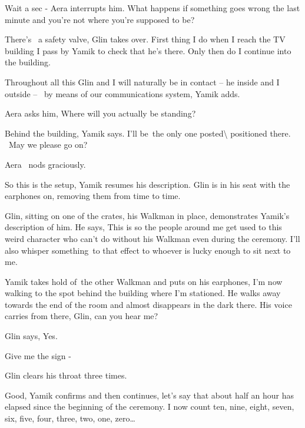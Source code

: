 \documentclass[letterpaper]{article}
\begin{document}
{\textquotedbl}Wait a sec - {\textquotedbl} Aera interrupts him. {\textquotedbl}What happens if something goes wrong the
last minute and you're not where you're supposed to be?{\textquotedbl} 

{\textquotedbl}There's ~a safety valve,{\textquotedbl} Glin takes over. {\textquotedbl}First thing I do when I reach the
TV building I pass by Yamik to check that he's there. Only then do I continue into the building.{\textquotedbl} 

{\textquotedbl}Throughout all this Glin and I will naturally be in contact -- he inside and I outside -- \ by means of
our communications system,{\textquotedbl} Yamik adds.

Aera asks him, {\textquotedbl}Where will you actually be standing?{\textquotedbl} 

{\textquotedbl}Behind the building,{\textquotedbl} Yamik says. {\textquotedbl}I'll be~the only one
posted{\textbackslash} positioned there.{ \ }May we please go
on?{\textbar}{\textquotedbl}

Aera \ nods graciously.

{\textquotedbl}So this is the setup,{\textquotedbl} Yamik resumes his description. {\textquotedbl}Glin is in his seat
with the earphones on, removing them from time to time.{\textquotedbl} 

Glin, sitting on one of the crates, his Walkman in place, demonstrates Yamik's description of him. He says,
{\textquotedbl}This is so the{ }people around me get used to this weird
character who can't do without his Walkman even during the ceremony. I'll also whisper something~to that effect to
whoever is lucky enough to sit next to me.{\textquotedbl} 

Yamik takes hold of~the other Walkman and puts on his earphones, {\textquotedbl}I'm now walking to the spot behind the
building where I'm stationed.{\textquotedbl} He walks away towards the end of the room and almost disappears in the
dark there. His voice carries from there, {\textquotedbl}Glin, can you hear me?{\textquotedbl} 

Glin says, {\textquotedbl}Yes.{\textquotedbl} 

{\textquotedbl}Give me the sign -{\textquotedbl}

Glin clears his throat three times. 

{\textquotedbl}Good,{\textquotedbl} Yamik confirms and then continues, {\textquotedbl}let's say that about half an hour
has elapsed since the beginning of the ceremony. I now count ten, nine, eight, seven, six, five, four, three, two, one,
zero{\dots}{\textquotedbl} 
\end{document}

